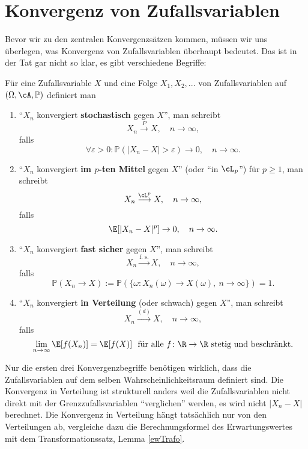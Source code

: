 \section{Konvergenz von Zufallsvariablen}
Bevor wir zu den zentralen Konvergenzs\"atzen kommen, m\"ussen wir uns \"uberlegen, was Konvergenz von Zufallsvariablen \"uberhaupt bedeutet. Das ist in der Tat gar nicht so klar, es gibt verschiedene Begriffe:
\begin{deff}
	Für eine Zufallsvariable $X$ und eine Folge $X_1,X_2,...$ von Zufallsvariablen auf $(\Omega, \cA, \mathbb{P})$  definiert man
	\begin{enumerate}[label=(\roman*)]
		\item \enquote{$X_n$ konvergiert \textbf{stochastisch} gegen $X$}, man schreibt		
		$$X_n \overset{P}{\longrightarrow} X, \quad n \to \infty,$$ falls $$\forall \varepsilon > 0\colon \mathbb{P}(|X_n-X|>\varepsilon) \to 0, \quad n \to \infty.$$
		\item \enquote{$X_n$ konvergiert \textbf{im $p$-ten Mittel} gegen $X$} (oder \enquote{in $\cL_p$}) f\"ur $p\geq 1$, man schreibt
		$$X_n \overset{\cL^p}{\longrightarrow} X, \quad n \to \infty,$$ falls $$\E[|X_n - X|^p] \to 0, \quad n \to \infty.$$
		\item 
		\enquote{$X_n$ konvergiert \textbf{fast sicher} gegen $X$}, man schreibt
		$$X_n \overset{\text{f. s.}}{\longrightarrow} X, \quad n \to \infty,$$ falls $$\mathbb{P}(X_n \to X) := \mathbb{P}(\{ \omega\colon X_n(\omega) \to X(\omega), \: n\to \infty \}) = 1.$$
		\item 
		 \enquote{$X_n$ konvergiert  \textbf{in Verteilung} (oder schwach) gegen $X$}, man schreibt		
		$$X_n \overset{(d)}{\longrightarrow} X, \quad n \to \infty,$$ falls $$\lim\limits_{n \to \infty} \E[f(X_n)] = \E[f(X)]\,\, \text{ f\"ur alle } f \colon \R \to \R \text{ stetig und beschränkt}.$$
	\end{enumerate}
\end{deff}
Nur die ersten drei Konvergenzbegriffe ben\"otigen wirklich, dass die Zufallsvariablen auf dem selben Wahrscheinlichkeitsraum definiert sind. Die Konvergenz in Verteilung ist strukturell anders weil die Zufallsvariablen nicht direkt mit der Grenzzufallsvariablen \enquote{verglichen} werden, es wird nicht $|X_n-X|$ berechnet. Die Konvergenz in Verteilung h\"angt tats\"achlich nur von den Verteilungen ab, vergleiche dazu die Berechnungsformel des Erwartungswertes mit dem Transformationssatz, Lemma \ref{ewTrafo}.
